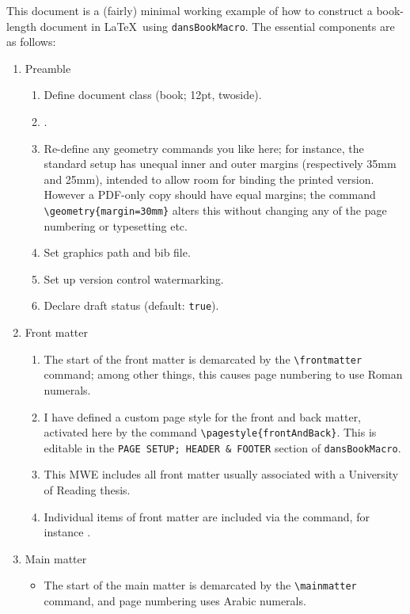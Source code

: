 This document is a (fairly) minimal working example of how to construct a book-length document in \LaTeX\ using \texttt{dansBookMacro}.
The essential components are as follows:
\begin{enumerate}
    \item Preamble
    \begin{enumerate}
        \item Define document class (book; 12pt, twoside).
        \item \verb!!.
        \item Re-define any geometry commands you like here; for instance, the standard setup has unequal inner and outer margins (respectively 35mm and 25mm), intended to allow room for binding the printed version.
        However a PDF-only copy should have equal margins; the command \verb!\geometry{margin=30mm}! alters this without changing any of the page numbering or typesetting etc.
        \item Set graphics path and bib file.
        \item Set up version control watermarking.
        \item Declare draft status (default: \texttt{true}).
    \end{enumerate}
    \item Front matter
    \begin{enumerate}
        \item The start of the front matter is demarcated by the \verb!\frontmatter! command; among other things, this causes page numbering to use Roman numerals.
        \item I have defined a custom page style for the front and back matter, activated here by the command \verb!\pagestyle{frontAndBack}!.
        This is editable in the \texttt{PAGE SETUP; HEADER \& FOOTER} section of \texttt{dansBookMacro}.
        \item This MWE includes all front matter usually associated with a University of Reading thesis.
        \item Individual items of front matter are included via the \verb!! command, for instance \verb!!.
    \end{enumerate}
    \item Main matter
    \begin{itemize}
        \item The start of the main matter is demarcated by the \verb!\mainmatter! command, and page numbering uses Arabic numerals.

\end{itemize}
\end{enumerate}
